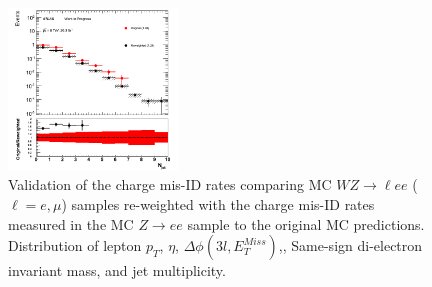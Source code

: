 \begin{figure}[htp]
 \includegraphics[width=0.4\textwidth]{figures/ChargeMisID/Validation_ChargeMisIDRates_WZ_JetMultiplicity.png}

 \caption{Validation of the charge mis-ID rates comparing 
 MC $WZ\rightarrow \ell ee$ ($\ell=e,\mu$) samples re-weighted with the 
 charge mis-ID rates measured in the MC $Z\to{}ee$ 
 sample to the original MC predictions. Distribution of 
 lepton $p_{T}$, $\eta$, $\Delta \phi(3l,E_{T}^{Miss})$,\met{}, Same-sign 
 di-electron invariant mass, and jet multiplicity.}
 \label{fig:ChargeMisID_Validation_WZ}
 \end{figure}
 
